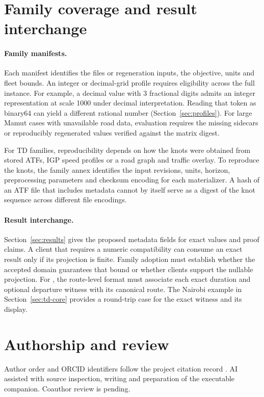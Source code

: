 \section{Family coverage and result interchange}\label{sec:open}

\paragraph{Family manifests.}
Each manifest identifies the files or regeneration inputs, the objective, units and fleet bounds. An integer or decimal-grid profile requires eligibility across the full instance. For example, a decimal value with 3 fractional digits admits an integer representation at scale 1000 under decimal interpretation. Reading that token as binary64 can yield a different rational number (Section~\ref{sec:profiles}). For large Mamut cases with unavailable road data, evaluation requires the missing sidecars or reproducibly regenerated values verified against the matrix digest.

For TD families, reproducibility depends on how the knots were obtained from stored ATFs, IGP speed profiles or a road graph and traffic overlay. To reproduce the knots, the family annex identifies the input revisions, units, horizon, preprocessing parameters and checksum encoding for each materializer. A hash of an ATF file that includes metadata cannot by itself serve as a digest of the knot sequence across different file encodings.

\paragraph{Result interchange.}
Section~\ref{sec:results} gives the proposed metadata fields for exact values and proof claims. A client that requires a numeric compatibility  can consume an exact result only if its projection is finite. Family adoption must establish whether the accepted domain guarantees that bound or whether clients support the nullable projection. For , the route-level format must associate each exact duration and optional departure witness with its canonical route. The Nairobi example in Section~\ref{sec:td-core} provides a round-trip case for the exact witness and its display.

\section*{Authorship and review}
Author order and ORCID identifiers follow the project citation record \autocite{pichonMAMUTRouting2026}. AI assisted with source inspection, writing and preparation of the executable companion. Coauthor review is pending.
